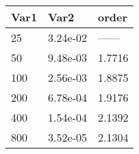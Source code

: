 \begin{tabular}{lll}
Var1 & Var2 & order \\ 
\hline 
25 & 3.24e-02 & ------ \\ 
50 & 9.48e-03 & 1.7716 \\ 
100 & 2.56e-03 & 1.8875 \\ 
200 & 6.78e-04 & 1.9176 \\ 
400 & 1.54e-04 & 2.1392 \\ 
800 & 3.52e-05 & 2.1304 \\ 
\hline 
\end{tabular}